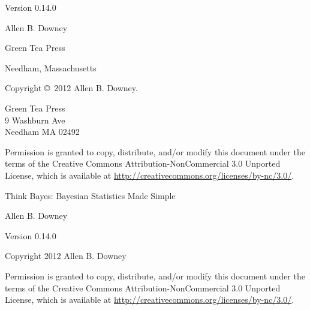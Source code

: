 \documentclass[12pt]{book}
\newcommand{\thetitle}{Think Bayes: Bayesian Statistics Made Simple}
\newcommand{\theversion}{0.14.0}
\begin{document}
\begin{latexonly}
\begin{flushright}
Version \theversion

\vspace{1in}


{\Large
Allen B. Downey\\
}


\vspace{0.5in}

{\Large Green Tea Press}

{\small Needham, Massachusetts}

\vfill

\end{flushright}


\pagebreak
\thispagestyle{empty}

Copyright \copyright ~2012 Allen B. Downey.


\vspace{0.2in}

\begin{flushleft}
Green Tea Press       \\
9 Washburn Ave \\
Needham MA 02492
\end{flushleft}

Permission is granted to copy, distribute, and/or modify this document
under the terms of the Creative Commons Attribution-NonCommercial 3.0 Unported
License, which is available at \url{http://creativecommons.org/licenses/by-nc/3.0/}.

\vspace{0.2in}

\end{latexonly}



\begin{htmlonly}


{\Large \thetitle}

{\large Allen B. Downey}

Version \theversion

\vspace{0.25in}

Copyright 2012 Allen B. Downey

\vspace{0.25in}

Permission is granted to copy, distribute, and/or modify this document
under the terms of the Creative Commons Attribution-NonCommercial 3.0
Unported License, which is available at
\url{http://creativecommons.org/licenses/by-nc/3.0/}.

\setcounter{chapter}{-1}

\end{htmlonly}
\end{document}
